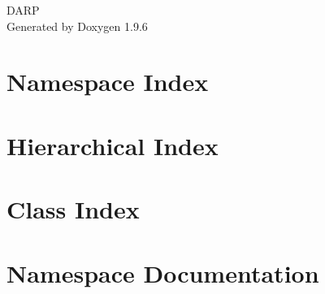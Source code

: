 \documentclass[twoside]{book}
\newcommand{\+}{\discretionary{\mbox{\scriptsize$\hookleftarrow$}}{}{}}
\newcommand{\clearemptydoublepage}{%
    \newpage{\pagestyle{empty}\cleardoublepage}%
  }
\begin{document}
  \raggedbottom
    \hypersetup{pageanchor=false,
                bookmarksnumbered=true,
                pdfencoding=unicode
               }
  \begin{titlepage}
  \vspace*{7cm}
  \begin{center}%
  {\Large DARP}\\
  \vspace*{1cm}
  {\large Generated by Doxygen 1.9.6}\\
  \end{center}
  \end{titlepage}
  \clearemptydoublepage
  \tableofcontents
  \clearemptydoublepage
  \hypersetup{pageanchor=true}
\chapter{Namespace Index}

\chapter{Hierarchical Index}

\chapter{Class Index}

\chapter{Namespace Documentation}









\end{document}
